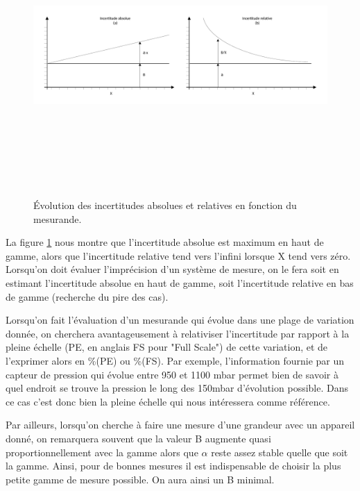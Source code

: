 \begin{figure}[h]
    \centering
    \includegraphics[height=10.7cm]{assets/figures/incertitudes.pdf}
    \caption{Évolution des incertitudes absolues et relatives en fonction du mesurande.}
    \label{fig:incertitudes_absolues_et_relatives}
\end{figure}

La figure \ref{fig:incertitudes_absolues_et_relatives} nous montre que l'incertitude absolue est maximum en haut de gamme, alors que l'incertitude relative tend vers l'infini lorsque X tend vers zéro. Lorsqu'on doit évaluer l'imprécision d'un système de mesure, on le fera soit en estimant l'incertitude absolue en haut de gamme, soit l'incertitude relative en bas de gamme (recherche du pire des cas).

Lorsqu'on fait l'évaluation d'un mesurande qui évolue dans une plage de variation donnée, on cherchera avantageusement à relativiser l'incertitude par rapport à la pleine échelle (PE, en anglais FS pour "Full Scale") de cette variation, et de l'exprimer alors en \%(PE) ou \%(FS). Par exemple, l'information fournie par un capteur de pression qui évolue entre 950 et 1100 mbar permet bien de savoir à quel endroit se trouve la pression le long des 150mbar d'évolution possible. Dans ce cas c'est donc bien la pleine échelle qui nous intéressera comme référence.

Par ailleurs, lorsqu'on cherche à faire une mesure d'une grandeur avec un appareil donné, on remarquera souvent que la valeur B augmente quasi proportionnellement avec la gamme alors que $\alpha$ reste assez stable quelle que soit la gamme. Ainsi, pour de bonnes mesures il est indispensable de choisir la plus petite gamme de mesure possible. On aura ainsi un B minimal.

